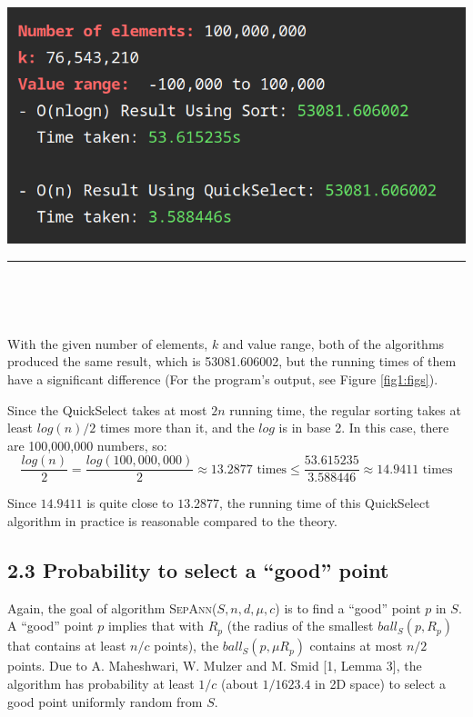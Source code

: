 \documentclass[12pt,english,]{article}
\let\origfigure\figure
\let\endorigfigure\endfigure
\renewenvironment{figure}[1][2] {
    \expandafter\origfigure\expandafter[H]
} {
    \endorigfigure
}
\begin{document}
\begin{figure}

{\centering \includegraphics[width=0.7\linewidth]{./images_&_data/kth_smallest/100m} 

}

\caption{\label{fig1:figs}The outputs of the $O(NlogN)$ algorithm using regular sorting and the $O(n)$ QuickSelect algorithm that recurses only once.}\label{fig:unnamed-chunk-1}
\end{figure}

\hrule

~

~

With the given number of elements, \(k\) and value range, both of the
algorithms produced the same result, which is 53081.606002, but the
running times of them have a significant difference (For the program's
output, see Figure \ref{fig1:figs}).

Since the QuickSelect takes at most \(2n\) running time, the regular
sorting takes at least \(log(n)/2\) times more than it, and the \(log\)
is in base 2. In this case, there are 100,000,000 numbers, so:
\[\frac{log(n)}{2} = \frac{log(100,000,000)}{2} \approx 13.2877 \text{ times} \leq \frac{53.615235}{3.588446} \approx 14.9411 \text{ times}\]

Since \(14.9411\) is quite close to \(13.2877\), the running time of
this QuickSelect algorithm in practice is reasonable compared to the
theory.

\hypertarget{probability-to-select-a-good-point}{%
\subsection{2.3 Probability to select a ``good''
point}\label{probability-to-select-a-good-point}}

Again, the goal of algorithm \textsc{SepAnn($S,n,d,\mu,c$)} is to find a
``good'' point \(p\) in \(S\). A ``good'' point \(p\) implies that with
\(R_p\) (the radius of the smallest \(ball_S(p,R_p)\) that contains at
least \(n/c\) points), the \(ball_S(p,\mu R_p)\) contains at most
\(n/2\) points. Due to A. Maheshwari, W. Mulzer and M. Smid {[}1, Lemma
3{]}, the algorithm has probability at least \(1/c\) (about \(1/1623.4\)
in 2D space) to select a good point uniformly random from \(S\).
\end{document}
